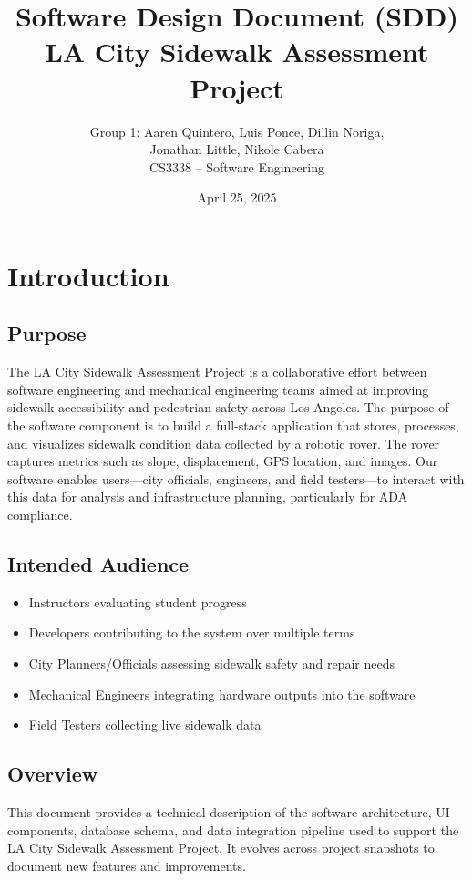 \documentclass[12pt]{article}
\title{Software Design Document (SDD) \\
\large LA City Sidewalk Assessment Project}
\author{Group 1: Aaren Quintero, Luis Ponce, Dillin Noriga, \\
Jonathan Little, Nikole Cabera \\
CS3338 – Software Engineering}
\date{April 25, 2025}
\begin{document}
\maketitle

\tableofcontents %
\newpage %

\section{Introduction}

\subsection{Purpose}
The LA City Sidewalk Assessment Project is a collaborative effort between software engineering and mechanical engineering teams aimed at improving sidewalk accessibility and pedestrian safety across Los Angeles. The purpose of the software component is to build a full-stack application that stores, processes, and visualizes sidewalk condition data collected by a robotic rover. The rover captures metrics such as slope, displacement, GPS location, and images. Our software enables users—city officials, engineers, and field testers—to interact with this data for analysis and infrastructure planning, particularly for ADA compliance.

\subsection{Intended Audience}
\begin{itemize}
  \item Instructors evaluating student progress
  \item Developers contributing to the system over multiple terms
  \item City Planners/Officials assessing sidewalk safety and repair needs
  \item Mechanical Engineers integrating hardware outputs into the software
  \item Field Testers collecting live sidewalk data
\end{itemize}

\subsection{Overview}
This document provides a technical description of the software architecture, UI components, database schema, and data integration pipeline used to support the LA City Sidewalk Assessment Project. It evolves across project snapshots to document new features and improvements.
\end{document}
